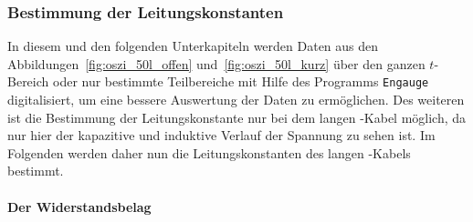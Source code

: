 \clearpage
\subsubsection{Bestimmung der Leitungskonstanten}
\label{ssub:bestimmung_der_leitungskonstanten}

In diesem und den folgenden Unterkapiteln werden Daten aus den
Abbildungen~\ref{fig:oszi_50l_offen} und~\ref{fig:oszi_50l_kurz} über den
ganzen $t$-Bereich oder nur bestimmte Teilbereiche mit Hilfe des Programms
\texttt{Engauge} digitalisiert, um eine bessere Auswertung der Daten zu
ermöglichen. Des weiteren ist die Bestimmung der Leitungskonstante nur bei
dem langen \CU-Kabel möglich, da nur hier der kapazitive und induktive Verlauf
der Spannung zu sehen ist. Im Folgenden werden daher nun die Leitungskonstanten
des langen \CU-Kabels bestimmt.

\paragraph{Der Widerstandsbelag}
\label{par:der_widerstandsbelag}

